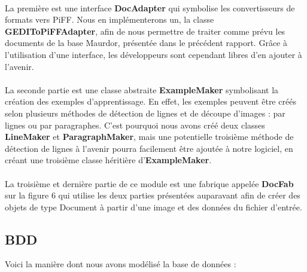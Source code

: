 \paragraph{}

La première est  une interface \textbf{DocAdapter} qui symbolise les convertisseurs de formats vers PiFF. Nous en implémenterons un, la classe \textbf{GEDIToPiFFAdapter}, afin de nous permettre de traiter comme prévu les documents de la base Maurdor, présentée dans le précédent rapport. Grâce à l’utilisation d’une interface, les développeurs sont cependant libres d’en ajouter à l’avenir.

\paragraph{}

La seconde partie est une classe abstraite \textbf{ExampleMaker} symbolisant la création des exemples d’apprentissage. En effet, les exemples peuvent être créés selon plusieurs méthodes de détection de lignes et de découpe d’images : par lignes ou par paragraphes. C’est pourquoi nous avons créé deux classes \textbf{LineMaker} et \textbf{ParagraphMaker}, mais une potentielle troisième méthode de détection de lignes à l’avenir pourra facilement être ajoutée à notre logiciel, en créant une troisième classe héritière d’\textbf{ExampleMaker}.

\paragraph{}

La troisième et dernière partie de ce module est une fabrique appelée \textbf{DocFab} sur la figure 6 qui utilise les deux parties présentées auparavant afin de créer des objets de type Document à partir d’une image et des données du fichier d’entrée.

\subsection{BDD}

Voici la manière dont nous avons modélisé la base de données :

\paragraph{}


